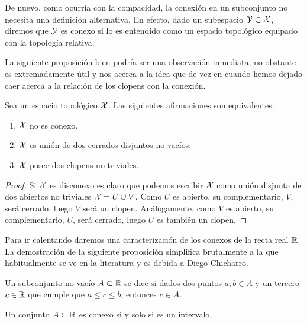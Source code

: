 \begin{obs}
	De nuevo, como ocurría con la compacidad, la conexión en un subconjunto no necesita una definición alternativa. En efecto, dado un subespacio $\mathcal{Y}\subset\mathcal{X}$, diremos que $\mathcal{Y}$ es conexo si lo es entendido como un espacio topológico equipado con la topología relativa.
\end{obs}
La siguiente proposición bien podría ser una observación inmediata, no obstante es extremadamente útil y nos acerca a la idea que de vez en cuando hemos dejado caer acerca a la relación de los clopens con la conexión.
\begin{prop}
	Sea un espacio topológico $\mathcal{X}$. Las siguientes afirmaciones son equivalentes:
	\begin{enumerate}
		\item $\mathcal{X}$ no es conexo.
		\item $\mathcal{X}$ es unión de dos cerrados disjuntos no vacíos.
		\item $\mathcal{X}$ posee dos clopens no triviales.
	\end{enumerate}
\end{prop}
\begin{proof}
	Si $\mathcal{X}$ es disconexo es claro que podemos escribir $\mathcal{X}$ como unión disjunta de dos abiertos no triviales $\mathcal{X}=U\cup V$. Como $U$ es abierto, su complementario, $V$, será cerrado, luego $V$ será un clopen. Análogamente, como $V$ es abierto, su complementario, $U$, será cerrado, luego $U$ es también un clopen.
\end{proof}
Para ir calentando daremos una caracterización de los conexos de la recta real $\mathbb{R}$. La demostración de la siguiente proposición simplifica brutalmente a la que habitualmente se ve en la literatura y es debida a Diego Chicharro.
\begin{defi}[Intervalo]
	Un subconjunto no vacío $A\subset\mathbb{R}$ se dice  si dados dos puntos $a,b\in A$ y un tercero $c\in\mathbb{R}$ que cumple que $a\leq c\leq b$, entonces $c\in A$. 
\end{defi}
\begin{prop}
	Un conjunto $A\subset \mathbb{R}$ es conexo si y solo si es un intervalo. 
\end{prop}

